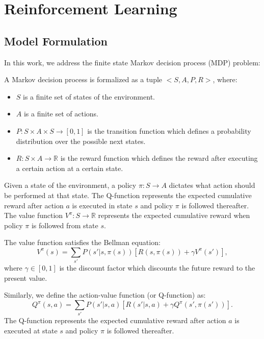\chapter{Reinforcement Learning}
\label{ch:RL}
\section{Model Formulation}

In this work, we address the finite state Markov decision process (MDP) problem:
\begin{definition} A Markov decision process is formalized as a tuple $<S, A, P, R>$, where:
\begin{itemize}
    \item $S$ is a finite set of states of the environment.
    \item $A$ is a finite set of actions.
    \item $P:S \times A \times S \rightarrow [0, 1]$ is the transition function which defines a probability distribution over the possible next states.
    \item $R:S \times A \rightarrow \mathbb{R}$ is the reward function which defines the reward after executing a certain action at a certain state.
 \end{itemize}
\end{definition}

Given a state of the environment, a policy $\pi: S \rightarrow A$ dictates what action should be performed at that state. 
The Q-function represents the expected cumulative reward after action $a$ is executed in state $s$ and 
policy $\pi$ is followed thereafter.
The value function $V^{\pi}: S \rightarrow \mathbb{R}$ represents the expected cumulative reward when 
policy $\pi$ is followed from state $s$.

The value function satisfies the Bellman equation:
\begin{equation}
    V^{\pi}(s) = \sum_{s'}P(s'|s, \pi(s))[R(s, \pi(s)) + \gamma V^{\pi}(s')],
    \label{eq:V}
\end{equation}
where $\gamma \in [0, 1]$ is the discount factor which discounts the future reward to the present value.

Similarly, we define the action-value function (or Q-function) as:
\begin{equation}
    Q^{\pi}(s, a) = \sum_{s'}P(s'|s, a)[R(s'|s, a) + \gamma Q^{\pi}(s', \pi(s'))].
    \label{eq:Q}
\end{equation}
The Q-function represents the expected cumulative reward after action $a$ is executed at state $s$ and 
policy $\pi$ is followed thereafter.

